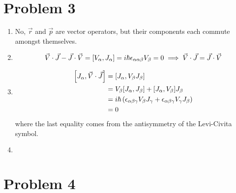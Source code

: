 \documentclass[12pt]{article}
\begin{document}
\section*{Problem 3}
\begin{enumerate}[label=(\alph*)]
    \item No, $\vec{r}$ and $\vec{p}$ are vector operators, but their components each commute amongst themselves.
    \item \[ \vec{V}\cdot\vec{J} - \vec{J}\cdot\vec{V} = \comm{V_\alpha}{J_\alpha} = i\hbar\epsilon_{\alpha\alpha\beta}V_\beta = 0 \implies \vec{V}\cdot\vec{J} = \vec{J}\cdot\vec{V} \]
    \item
    \begin{align*}
        \comm{J_\alpha}{\vec{V}\cdot\vec{J}} &= \comm{J_\alpha}{V_\beta J_\beta} \\
        &= V_\beta\comm{J_\alpha}{J_\beta} + \comm{J_\alpha}{V_\beta}J_\beta \\
        &= i\hbar\left(\epsilon_{\alpha\beta\gamma}V_\beta J_\gamma + \epsilon_{\alpha\beta\gamma}V_\gamma J_\beta\right) \\
        &= 0
    \end{align*}
    where the last equality comes from the antisymmetry of the Levi-Civita symbol.
    \item 
\end{enumerate}


\section*{Problem 4}
\end{document}
